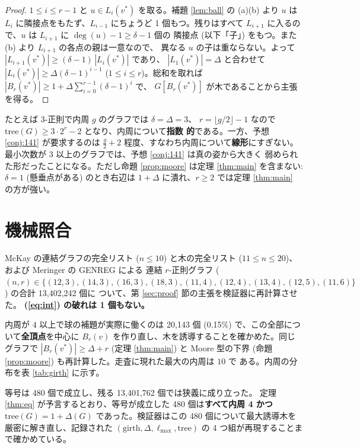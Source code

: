 \documentclass[paper=a4,fontsize=10.5pt,jafontsize=10.5pt]{jlreq}
\theoremstyle{plain}
\theoremstyle{definition}
\begin{document}
\begin{proof}
$1 \le i \le r-1$ と $u \in L_i(v^*)$ を取る。補題 \ref{lem:ball} の (a)(b) より
$u$ は $L_i$ に隣接点をもたず、$L_{i-1}$ にちょうど 1 個もつ。残りはすべて
$L_{i+1}$ に入るので、$u$ は $L_{i+1}$ に $\deg(u) - 1 \ge \delta - 1$ 個の
隣接点 (以下「子」) をもつ。また (b) より $L_{i+1}$ の各点の親は一意なので、
異なる $u$ の子は重ならない。よって
$|L_{i+1}(v^*)| \ge (\delta-1)\,|L_i(v^*)|$ であり、
$|L_1(v^*)| = \Delta$ と合わせて $|L_i(v^*)| \ge \Delta(\delta-1)^{i-1}$
($1 \le i \le r$)。総和を取れば
$|B_r(v^*)| \ge 1 + \Delta \sum_{i=0}^{r-1} (\delta-1)^i$ で、
$G[B_r(v^*)]$ が木であることから主張を得る。
\end{proof}

たとえば $3$-正則で内周 $g$ のグラフでは $\delta = \Delta = 3$、
$r = \lfloor g/2 \rfloor - 1$ なので
$\mathrm{tree}(G) \ge 3 \cdot 2^{r} - 2$ となり、内周について\textbf{指数
的}である。一方、予想 \ref{conj:141} が要求するのは
$\tfrac{g}{2} + 2$ 程度、すなわち内周について\textbf{線形}にすぎない。
最小次数が $3$ 以上のグラフでは、予想 \ref{conj:141} は真の姿から大きく
弱められた形だったことになる。ただし命題 \ref{prop:moore} は定理
\ref{thm:main} を含まない: $\delta = 1$ (懸垂点がある) のとき右辺は
$1 + \Delta$ に潰れ、$r \ge 2$ では定理 \ref{thm:main} の方が強い。

\section{機械照合}\label{sec:check}

McKay \cite{mckay} の連結グラフの完全リスト ($n \le 10$) と木の完全リスト
($11 \le n \le 20$)、および Meringer の GENREG \cite{genreg} による
連結 $r$-正則グラフ ($(n, r) \in \{(12, 3), (14, 3), (16, 3), (18, 3), (11, 4), (12, 4), (13, 4), (12, 5), (11, 6)\}$) の合計 13,402,242 個に
ついて、第 \ref{sec:proof} 節の主張を検証器に再計算させた。
\textbf{(\ref{eq:int}) の破れは 1 個もない。}

内周が $4$ 以上で球の補題が実際に働くのは 20,143 個
(0.15\%) で、この全部について\textbf{全頂点}を中心に
$B_r(v)$ を作り直し、木を誘導することを確かめた。同じグラフで
$|B_r(v^*)| \ge \Delta + r$ (定理 \ref{thm:main}) と Moore 型の下界
(命題 \ref{prop:moore}) も再計算した。走査に現れた最大の内周は $10$ で
ある。内周の分布を表 \ref{tab:girth} に示す。

等号は 480 個で成立し、残る 13,401,762 個では狭義に成り立った。
定理 \ref{thm:eq} が予言するとおり、等号が成立した 480 個は\textbf{すべて内周 4 かつ }$\mathrm{tree}(G) = 1 + \Delta(G)$ であった。検証器はこの 480 個について最大誘導木を厳密に解き直し、記録された $(\mathrm{{girth}}, \Delta, \ell_{{\max}}, \mathrm{{tree}})$ の 4 つ組が再現することまで確かめている。
\end{document}
